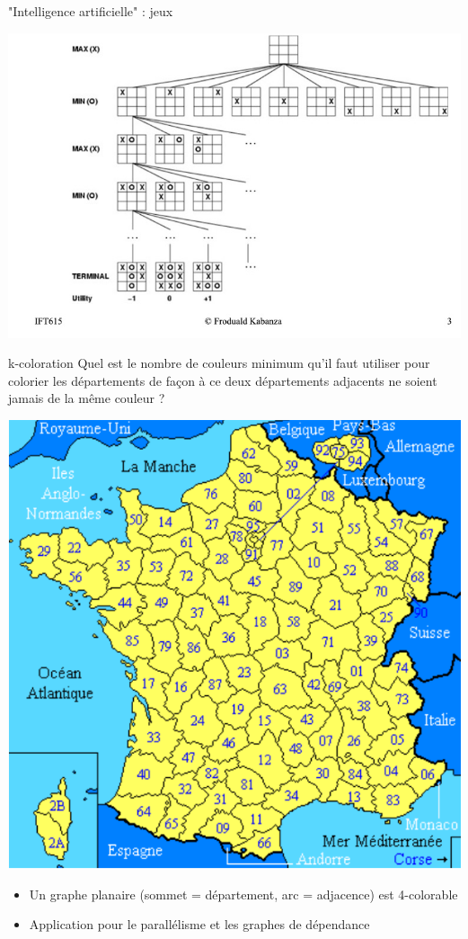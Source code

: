 \begin{frame}{"Intelligence artificielle" : jeux}
    \begin{center}
        \includegraphics[width=.9\textwidth]{fig/morpion.jpg}
    \end{center} 
\end{frame}

\begin{frame}{k-coloration}
Quel est le nombre de couleurs minimum qu'il faut utiliser pour colorier les départements de façon à ce deux départements adjacents ne soient jamais de la même couleur ?
\begin{center}
    \includegraphics[width=.5\textwidth]{fig/france.pdf}
\end{center} 
\begin{itemize}
    \item Un graphe planaire (sommet = département, arc = adjacence) est 4-colorable 
    \item Application pour le parallélisme et les graphes de dépendance 
\end{itemize}
\end{frame}